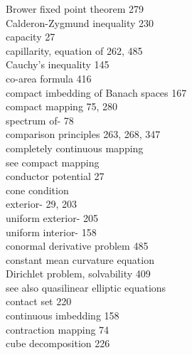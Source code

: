 \begin{flushleft}
Brower fixed point theorem \hspace{1em} 279\\
Calderon-Zygmund inequality \hspace{1em} 230\\
capacity \hspace{1em} 27\\
capillarity, equation of \hspace{1em} 262, 485\\
Cauchy's inequality \hspace{1em} 145\\
co-area formula \hspace{1em} 416\\
compact imbedding of Banach spaces \hspace{1em} 167\\
compact mapping \hspace{1em} 75, 280\\
\hspace*{1.5em} spectrum of- \hspace{1em} 78\\
comparison principles \hspace{1em} 263, 268, 347\\
completely continuous mapping\\
\hspace*{1.5em} see compact mapping\\
conductor potential \hspace{1em} 27\\[1.8em]

cone condition\\
\hspace*{1.5em} exterior- \hspace{1em} 29, 203\\
\hspace*{1.5em} uniform exterior- \hspace{1em} 205\\
\hspace*{1.5em} uniform interior- \hspace{1em} 158\\
conormal derivative problem \hspace{1em} 485\\
constant mean curvature equation\\
\hspace*{1.5em} Dirichlet problem, solvability \hspace{1em} 409\\
\hspace*{1.5em} see also quasilinear elliptic equations\\
contact set \hspace{1em} 220\\
continuous imbedding \hspace{1em} 158\\
contraction mapping \hspace{1em} 74\\
cube decomposition \hspace{1em} 226\\[1.8em]


\end{flushleft}
